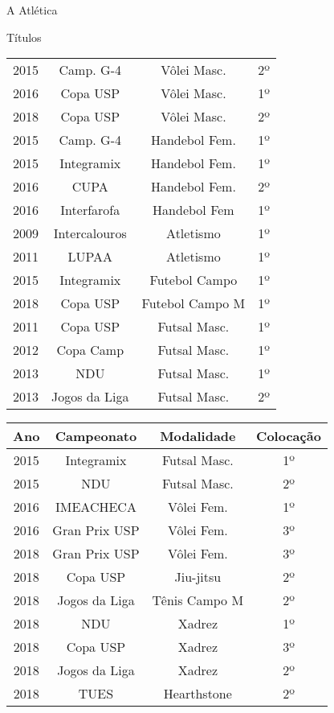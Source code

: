 \begin{secao}{A Atlética}
\begin{subsecao}{Títulos}
\begin{center}
\begin{tabular}{c|c|c|c}
    2015 & Camp. G-4      & Vôlei Masc.     & 2º\\
    2016 & Copa USP       & Vôlei Masc.     & 1º\\
    2018 & Copa USP       & Vôlei Masc.     & 2º\\
    2015 & Camp. G-4      & Handebol Fem.   & 1º\\
    2015 & Integramix     & Handebol Fem.   & 1º\\
    2016 & CUPA           & Handebol Fem.   & 2º\\
    2016 & Interfarofa    & Handebol Fem    & 1º\\
    2009 & Intercalouros  & Atletismo       & 1º\\
    2011 & LUPAA          & Atletismo       & 1º\\
    2015 & Integramix     & Futebol Campo   & 1º\\
    2018 & Copa USP       & Futebol Campo M & 1º\\
    2011 & Copa USP       & Futsal Masc.    & 1º\\
    2012 & Copa Camp      & Futsal Masc.    & 1º\\
    2013 & NDU            & Futsal Masc.    & 1º\\
    2013 & Jogos da Liga  & Futsal Masc.    & 2º\\
  \end{tabular}
\end{center}
\begin{center}
  \begin{tabular}{c|c|c|c}
    Ano & Campeonato & Modalidade & Colocação\\
    \hline
    2015 & Integramix     & Futsal Masc.    & 1º\\
    2015 & NDU            & Futsal Masc.    & 2º\\
    2016 & IMEACHECA      & Vôlei Fem.      & 1º\\
    2016 & Gran Prix USP  & Vôlei Fem.      & 3º\\
    2018 & Gran Prix USP  & Vôlei Fem.      & 3º\\
    2018 & Copa USP       & Jiu-jitsu       & 2º\\
    2018 & Jogos da Liga  & Tênis Campo M   & 2º\\
    2018 & NDU            & Xadrez          & 1º\\
    2018 & Copa USP       & Xadrez          & 3º\\
    2018 & Jogos da Liga  & Xadrez          & 2º\\
    2018 & TUES           & Hearthstone     & 2º
  \end{tabular}
\end{center}


\end{subsecao}
\end{secao}

